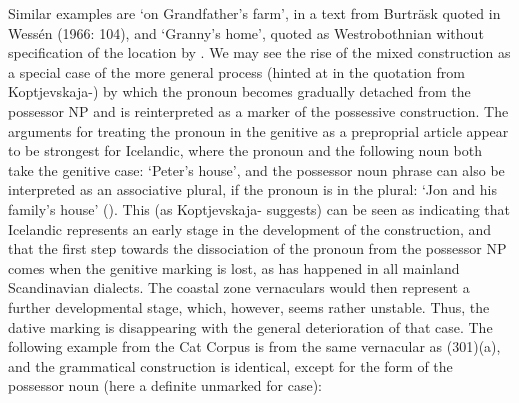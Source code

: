
\ea\label{}

\z 
\z

Similar examples are  ‘on Grandfather’s farm’, in a text from Burträsk quoted in Wessén (1966: 104), and  ‘Granny’s home’, quoted as Westrobothnian without specification of the location by \citet[131]{Larsson1929}. We may see the rise of the mixed construction as a special case of the more general process (hinted at in the quotation from Koptjevskaja-\citet{Tamm2003}) by which the pronoun becomes gradually detached from the possessor NP and is reinterpreted as a marker of the possessive construction. The arguments for treating the pronoun in the genitive as a preproprial article appear to be strongest for Icelandic, where the pronoun and the following noun both take the genitive case: ‘Peter’s house’, and the possessor noun phrase can also be interpreted as an associative plural, if the pronoun is in the plural:  ‘Jon and his family’s house’ (\citet[69]{Delsing2003b}). This (as Koptjevskaja-\citet[632]{Tamm2003} suggests) can be seen as indicating that Icelandic represents an early stage in the development of the construction, and that the first step towards the dissociation of the pronoun from the possessor NP comes when the genitive marking is lost, as has happened in all mainland Scandinavian dialects. The coastal zone vernaculars would then represent a further developmental stage, which, however, seems rather unstable. Thus, the dative marking is disappearing with the general deterioration of that case. The following example from the Cat Corpus is from the same vernacular as (301)(a), and the grammatical construction is identical, except for the form of the possessor noun (here a definite unmarked for case): 

